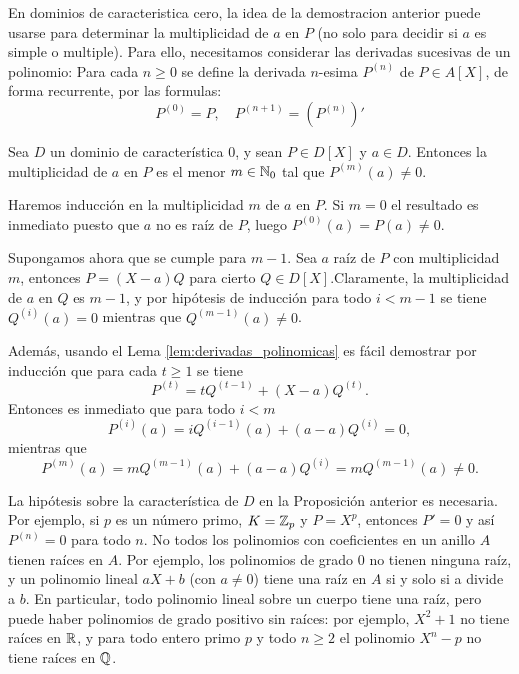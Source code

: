 En dominios de caracteristica cero, la idea de la demostracion anterior puede usarse para determinar la multiplicidad de $a$ en $P$ (no solo para decidir si $a$ es simple o multiple). Para ello, necesitamos considerar las derivadas sucesivas de un polinomio: Para cada $n\geq 0$ se define la derivada $n$-esima $P^{(n)}$ de $P\in A[X]$, de forma recurrente, por las formulas:
\[
P^{(0)} = P,\quad P^{(n+1)} = \left( P^{(n)} \right)'
\]

\begin{proposition}{}{}
Sea $D$ un dominio de característica 0, y sean $P \in D[X]$ y $a \in D$. Entonces la multiplicidad de $a$ en $P$ es el menor $m \in \mathbb{N}_0$ tal que $P^{(m)}(a) \neq 0$.
\end{proposition}

\begin{proofbox}
Haremos inducción en la multiplicidad $m$ de $a$ en $P$. Si $m = 0$ el resultado es inmediato puesto que $a$ no es raíz de $P$, luego $P^{(0)}(a) = P(a) \neq 0$.

Supongamos ahora que se cumple para $m-1$. Sea $a$ raíz de $P$ con multiplicidad $m$, entonces $P = (X - a)Q$ para cierto $Q \in D[X]$.Claramente, la multiplicidad de $a$ en $Q$ es $m - 1$, y por hipótesis de inducción para todo $i < m - 1$ se tiene $Q^{(i)}(a) = 0$ mientras que $Q^{(m-1)}(a) \neq 0$.

Además, usando el Lema \ref{lem:derivadas_polinomicas} es fácil demostrar por inducción que para cada $t \geq 1$ se tiene
\[
P^{(t)} = tQ^{(t-1)} + (X - a)Q^{(t)}.
\]
Entonces es inmediato que para todo $i < m$
\[
P^{(i)}(a) = iQ^{(i-1)}(a) + (a - a)Q^{(i)} = 0,
\]
mientras que 
\[
P^{(m)}(a) = mQ^{(m-1)}(a) + (a - a)Q^{(i)} = mQ^{(m-1)}(a) \neq 0.
\]
\end{proofbox}

La hipótesis sobre la característica de $D$ en la Proposición anterior es necesaria. Por ejemplo, si $p$ es un número primo, $K = \mathbb{Z}_p$ y $P = X^p$, entonces $P' = 0$ y así $P^{(n)} = 0$ para todo $n$. No todos los polinomios con coeficientes en un anillo $A$ tienen raíces en $A$. Por ejemplo, los polinomios de grado 0 no tienen ninguna raíz, y un polinomio lineal $aX + b$ (con $a \neq 0$) tiene una raíz en $A$ si y solo si a divide a $b$. En particular, todo polinomio lineal sobre un cuerpo tiene una raíz, pero puede haber polinomios de grado positivo sin raíces: por ejemplo, $X^2 + 1$ no tiene raíces en $\mathbb{R}$, y para todo entero primo $p$ y todo $n \geq 2$ el polinomio $X^n - p$ no tiene raíces en $\mathbb{Q}$.

